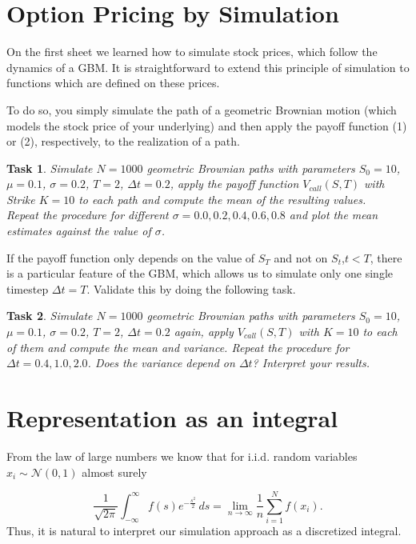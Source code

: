 \documentclass{scrartcl}
\newtheorem{task}{Task}
\begin{document}
	\section{Option Pricing by Simulation}
	On the first sheet we learned how to simulate stock prices, which follow the dynamics of a GBM. It is straightforward to extend this principle of simulation to functions which are defined on these prices.\par 
	To do so, you simply simulate the path of a geometric Brownian motion (which models the stock price of your underlying) and then apply the payoff function (1) or (2), respectively, to the realization of a path.
	
	\begin{task}
		Simulate $N = 1000$ geometric Brownian paths with parameters $S_0=10$, $\mu = 0.1$, $\sigma = 0.2$, $T = 2$, $\Delta t = 0.2$, apply the payoff function $V_{call}(S,T)$ with Strike $K=10$ to each path and compute the mean of the resulting values.\\
		Repeat the procedure for different $\sigma = 0.0,0.2,0.4,0.6,0.8$ and plot the mean estimates against the value of $\sigma$.
	\end{task}
	
	If the payoff function only depends on the value of $S_T$ and not on $S_t$,$t < T$, there is a particular feature of the GBM, which allows us to simulate only one single timestep $\Delta t=T$. Validate this by doing the following task.
	
	\begin{task}
		Simulate $N=1000$ geometric Brownian paths with parameters $S_0=10$, $\mu = 0.1$, $\sigma=0.2$, $T=2$, $\Delta t = 0.2$ again, apply $V_{call}(S,T)$ with $K=10$ to each of them and compute the mean and variance. Repeat the procedure for $\Delta t=0.4,1.0,2.0$. Does the variance depend on $\Delta t$? Interpret your results.
	\end{task}

	\section{Representation as an integral}
	
	From the law of large numbers we know that for i.i.d. random variables $x_i \sim \mathcal{N}(0,1)$ almost surely
	
	\begin{equation*}
		\frac{1}{\sqrt{2\pi}}\int_{-\infty}^{\infty} f(s) e^{-\frac{s^2}{2}}\,ds
		= \lim\limits_{n\rightarrow\infty} \frac{1}{n}\sum_{i=1}^{N}f(x_i)\text{.}
	\end{equation*}
	Thus, it is natural to interpret our simulation approach as a discretized integral.
	
\end{document}
